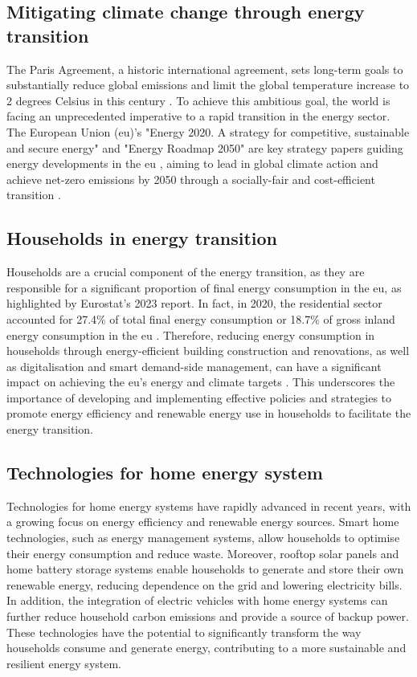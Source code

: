 \subsection{Mitigating climate change through energy transition}
The Paris Agreement, a historic international agreement, sets long-term goals to substantially reduce global emissions and limit the global temperature increase to 2 degrees Celsius in this century \cite{paris}.
To achieve this ambitious goal, the world is facing an unprecedented imperative to a rapid transition in the energy sector. 
The European Union (\gls{eu})'s "Energy 2020. A strategy for competitive, sustainable and secure energy" and "Energy Roadmap 2050" are key strategy papers guiding energy developments in the \gls{eu} \cite{roadmap}, aiming to lead in global climate action and achieve net-zero emissions by 2050 through a socially-fair and cost-efficient transition \cite{clean}. 


\subsection{Households in energy transition}

Households are a crucial component of the energy transition, as they are responsible for a significant proportion of final energy consumption in the \gls{eu}, as highlighted by Eurostat's 2023 report. 
In fact, in 2020, the residential sector accounted for 27.4\% of total final energy consumption or 18.7\% of gross inland energy consumption in the \gls{eu} \cite{eurostat}. 
Therefore, reducing energy consumption in households through energy-efficient building construction and renovations, as well as digitalisation and smart demand-side management, can have a significant impact on achieving the \gls{eu}'s energy and climate targets \cite{building}. 
This underscores the importance of developing and implementing effective policies and strategies to promote energy efficiency and renewable energy use in households to facilitate the energy transition.


\subsection{Technologies for home energy system}

Technologies for home energy systems have rapidly advanced in recent years, with a growing focus on energy efficiency and renewable energy sources. 
Smart home technologies, such as energy management systems, allow households to optimise their energy consumption and reduce waste. 
Moreover, rooftop solar panels and home battery storage systems enable households to generate and store their own renewable energy, reducing dependence on the grid and lowering electricity bills. 
In addition, the integration of electric vehicles with home energy systems can further reduce household carbon emissions and provide a source of backup power. 
These technologies have the potential to significantly transform the way households consume and generate energy, contributing to a more sustainable and resilient energy system.


